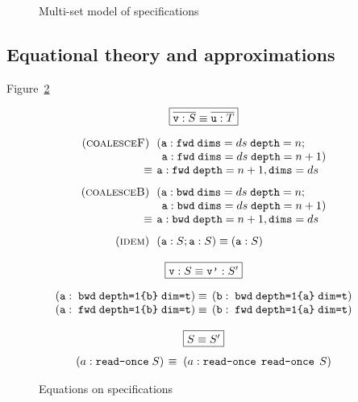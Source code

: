 \documentclass[9pt]{sigplanconf}
\theoremstyle{definition}
\begin{document}
\begin{figure}

\caption{Multi-set model of specifications}
\label{fig:model}
\end{figure}

\subsection{Equational theory and approximations}
\label{sec:eqs}

Figure~\ref{fig:equations}

\begin{figure}
\begin{align*}
\hspace{-1em}
\setlength{\arraycolsep}{0.05em}
\begin{array}{c}
\framebox{$\overline{\texttt{v} : S} \equiv \overline{\texttt{u} : T}$} \\[1em]
\begin{array}{rl}
(\textsc{coalesceF}) \;\; & (\texttt{a} : \texttt{fwd} \;
                       \texttt{dims}=ds \; \texttt{depth}=n; \\
&  \;\, \texttt{a} :  \texttt{fwd} \; \texttt{dims}=ds \; \texttt{depth}=n+1)\\
\equiv \; & \texttt{a} :  \texttt{fwd} \; \texttt{depth}=n+1,
         \texttt{dims}=ds \\[0.75em]
(\textsc{coalesceB}) \;\; & (\texttt{a} : \texttt{bwd} \;
                       \texttt{dims}=ds \; \texttt{depth}=n; \\
&  \;\, \texttt{a} :  \texttt{bwd} \; \texttt{dims}=ds \; \texttt{depth}=n+1) \\
\equiv \; & \texttt{a} :  \texttt{bwd} \; \texttt{depth}=n+1,
         \texttt{dims}=ds \\[0.75em]
(\textsc{idem}) \;\; & (\texttt{a} : S; \texttt{a} : S) \equiv (\texttt{a}
                  : S)
\end{array} \\ \\
\framebox{$\texttt{v} : S \equiv \texttt{v'} : S'$} \\[1em]
\begin{array}{ll}
(\texttt{a} : \; \texttt{bwd} \; \texttt{depth=1\{b\}} \;
  \texttt{dim=t})
\, & \equiv \,
(\texttt{b} : \; \texttt{bwd} \; \texttt{depth=1\{a\}} \;
  \texttt{dim=t})
\\
(\texttt{a} : \; \texttt{fwd} \; \texttt{depth=1\{b\}}\;
  \texttt{dim=t})
\, & \equiv \,
(\texttt{b} : \; \texttt{fwd} \; \texttt{depth=1\{a\}} \;
  \texttt{dim=t})
\end{array}
\\ \\
\framebox{$S \equiv S'$} \\[0.75em]
\begin{array}{ll}
(a : \texttt{read-once} \; S) \; & \equiv \; (a : \texttt{read-once} \;\,
  \texttt{read-once} \; \, S)
\end{array}
\end{array}
\end{align*}
\caption{Equations on specifications}
\label{fig:equations}
\end{figure}
\end{document}
